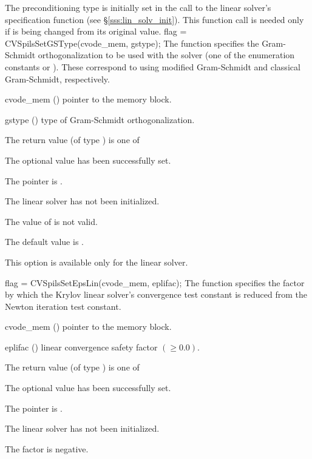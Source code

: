 {
  The preconditioning type is initially set in the call
  to the linear solver's specification function (see \S\ref{sss:lin_solv_init}). 
  This function call is needed only if  is being changed from its original 
  value.
}
{
  flag = CVSpilsSetGSType(cvode\_mem, gstype);
}
{
  The function  specifies the 
  Gram-Schmidt orthogonalization to be used with the {\cvspgmr} solver
  (one of the enumeration constants 
  or ). These correspond to using modified Gram-Schmidt 
  and classical Gram-Schmidt, respectively. 
}
{
  \begin{args}
  \item[cvode\_mem] ()
    pointer to the {\cvode} memory block.
  \item[gstype] ()
    type of Gram-Schmidt orthogonalization.
  \end{args}
}
{
  The return value  (of type ) is one of
  \begin{args}
  \item[\Id{CVSPILS\_SUCCESS}] 
    The optional value has been successfully set.
  \item[\Id{CVSPILS\_MEM\_NULL}]
    The  pointer is .
  \item[\Id{CVSPILS\_LMEM\_NULL}]
    The {\cvspils} linear solver has not been initialized.
  \item[\Id{CVSPILS\_ILL\_INPUT}]
    The value of  is not valid.
  \end{args}
}
{
  The default value is .

  {\warn}This option is available only for the {\cvspgmr} linear solver.
}
{
  flag = CVSpilsSetEpsLin(cvode\_mem, eplifac);
}
{
  The function  specifies the factor by
  which the Krylov linear solver's convergence test constant is reduced
  from the Newton iteration test constant.
}
{
  \begin{args}
  \item[cvode\_mem] ()
    pointer to the {\cvode} memory block.
  \item[eplifac] () linear convergence safety factor $( \geq 0.0)$.

  \end{args}
}
{
  The return value  (of type ) is one of
  \begin{args}
  \item[\Id{CVSPILS\_SUCCESS}] 
    The optional value has been successfully set.
  \item[\Id{CVSPILS\_MEM\_NULL}]
    The  pointer is .
  \item[\Id{CVSPILS\_LMEM\_NULL}]
    The {\cvspils} linear solver has not been initialized.
  \item[\Id{CVSPILS\_ILL\_INPUT}]
    The factor  is negative.  
  \end{args}
}
